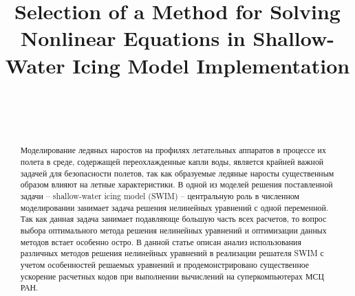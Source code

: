 \documentclass[
11pt,%
tightenlines,%
twoside,%
onecolumn,%
nofloats,%
nobibnotes,%
nofootinbib,%
superscriptaddress,%
noshowpacs,%
centertags]%
{revtex4}
\begin{document}

\title{Selection of a Method for Solving Nonlinear Equations in Shallow-Water Icing Model Implementation}

\author{~}

\author{~}



\begin{abstract}
Моделирование ледяных наростов на профилях летательных аппаратов в процессе их полета в среде, содержащей переохлажденные капли воды, является крайней важной задачей для безопасности полетов, так как образуемые ледяные наросты существенным образом влияют на летные характеристики.
В одной из моделей решения поставленной задачи -- shallow-water icing model (SWIM) -- центральную роль в численном моделировании занимает задача решения нелинейных уравнений с одной переменной.
Так как данная задача занимает подавляюще большую часть всех расчетов, то вопрос выбора оптимального метода решения нелинейных уравнений и оптимизации данных методов встает особенно остро.
В данной статье описан анализ использования различных методов решения нелинейных уравнений в реализации решателя SWIM с учетом особенностей решаемых уравнений и продемонстрировано существенное ускорение расчетных кодов при выполнении вычислений на суперкомпьютерах МСЦ РАН.
\end{abstract}



\maketitle
\end{document}
